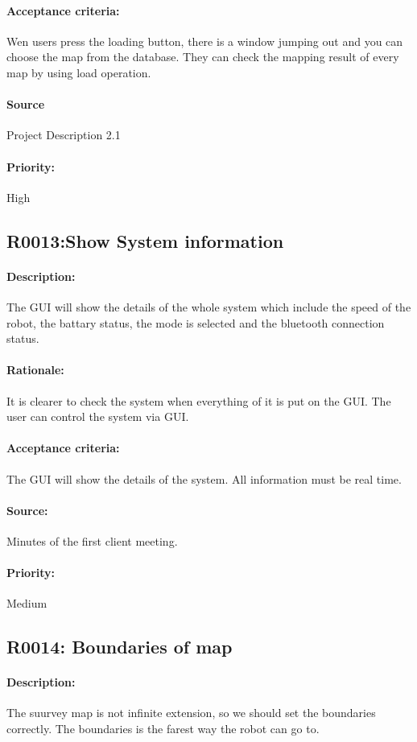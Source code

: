 \documentclass[11pt, a4paper]{report}
\begin{document}
\paragraph{Acceptance criteria:}
Wen users press the loading button, there is a window jumping out and you can choose the map from the database. They can check the mapping result of every map by using load operation.
\paragraph{Source}
 Project Description 2.1
\paragraph{Priority:}
High


\subsection{R0013:Show System information}
\paragraph{Description:}
The GUI will show the details of the whole system which include the speed of the robot, the battary status, the mode is selected and the bluetooth connection status.
\paragraph{Rationale:}
It is clearer to check the system when everything of it is put on the GUI. The user can control the system via GUI.
\paragraph{Acceptance criteria:}
The GUI will show the details of the system. All information must be real time.
\paragraph{Source:}
Minutes of the first client meeting.
\paragraph{Priority:}
Medium


\subsection{R0014: Boundaries of map}
\paragraph{Description:}
The suurvey map is not infinite extension, so we should set the boundaries correctly. The boundaries is the farest way the robot can go to.
\end{document}
